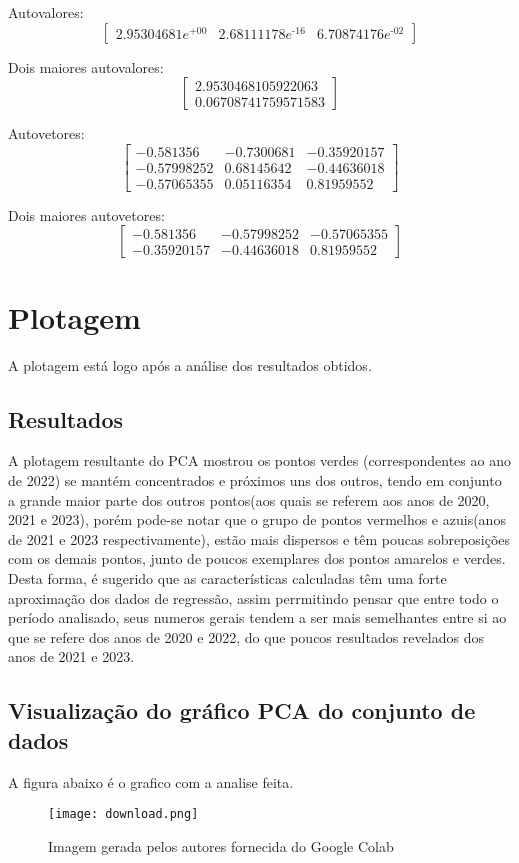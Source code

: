 \documentclass{article}
\begin{document}
Autovalores:
\[
\begin{bmatrix}
2.95304681e^\text{+00} & 2.68111178e^\text{-16} & 6.70874176e^\text{-02}
\end{bmatrix}
\]

Dois maiores autovalores:
\[
\begin{bmatrix}
2.9530468105922063\\
0.06708741759571583
\end{bmatrix}
\]

Autovetores:
\[
\begin{bmatrix}
-0.581356 &  -0.7300681 & -0.35920157\\
-0.57998252 & 0.68145642 & -0.44636018\\
-0.57065355 & 0.05116354 & 0.81959552
\end{bmatrix}
\]

Dois maiores autovetores:
\[
\begin{bmatrix}
-0.581356 & -0.57998252 & -0.57065355\\
-0.35920157 & -0.44636018 & 0.81959552
\end{bmatrix}
\]




\section{Plotagem}
A plotagem está logo após a análise dos resultados obtidos. 

\subsection{Resultados}

A plotagem resultante do PCA mostrou os pontos verdes (correspondentes ao ano de 2022) se mantém concentrados e próximos uns dos outros, tendo em conjunto a grande maior parte dos outros pontos(aos quais se referem aos anos de 2020, 2021 e 2023), porém pode-se notar que o grupo de pontos vermelhos e azuis(anos de 2021 e 2023 respectivamente), estão mais dispersos e têm poucas sobreposições com os demais pontos, junto de poucos exemplares dos pontos amarelos e verdes. Desta forma, é sugerido que as características calculadas têm uma forte aproximação dos dados de regressão, assim perrmitindo pensar que entre todo o período analisado, seus numeros gerais tendem a ser mais semelhantes entre si ao que se refere dos anos de 2020 e 2022, do que poucos resultados revelados dos anos de 2021 e 2023.

\subsection{Visualização do gráfico PCA do conjunto de dados}
A figura abaixo é o grafico com a analise feita.
\begin{figure}
\centering
\texttt{[image: download.png]}
\caption{\label{fig:frog}Imagem gerada pelos autores fornecida do Google Colab}
\end{figure}
\end{document}
